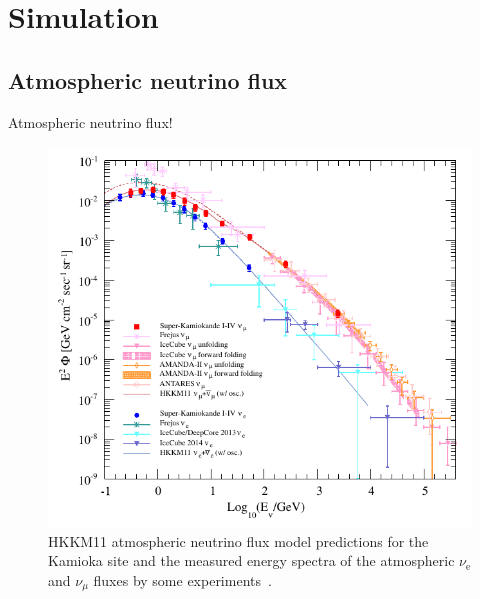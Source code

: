 
%
%

\section{Simulation}\label{Section_Simula}

\subsection{Atmospheric neutrino flux}
\vs\hs Atmospheric neutrino flux!

\begin{figure}[tbp]
	\centering
	\includegraphics[width=12cm]{Figures/Simulation/AtmNeuFlux}
	\caption[HKKM11 atmospheric neutrino flux model predictions for the Kamioka site and the measured energy spectra of the atmospheric $\nu_{\text{e}}$ and $\nu_{\mu}$ fluxes by some experiments]{\label{Simula_AtmNeuFlux} HKKM11 atmospheric neutrino flux model predictions for the Kamioka site and the measured energy spectra of the atmospheric $\nu_{\text{e}}$ and $\nu_{\mu}$ fluxes by some experiments~\cite{2011Honda,2016Richard}.}
\end{figure}

